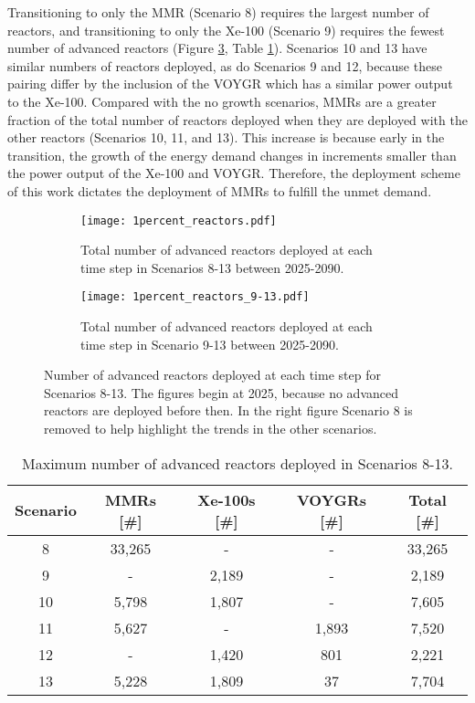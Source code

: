 Transitioning to only the 
\gls{MMR} (Scenario 8) requires the largest number of reactors, and 
transitioning to only the Xe-100 (Scenario 9) requires the fewest 
number of advanced reactors (Figure \ref{fig:1percent_reactors}, Table 
\ref{tab:reactors_1percent}). Scenarios 10 and 13 have similar numbers of 
reactors deployed, as do Scenarios 9 and 12, because these pairing differ 
by the inclusion of the VOYGR which has a similar power output to the 
Xe-100. 
Compared with the no growth scenarios, \glspl{MMR} are a greater 
fraction of the total number of reactors deployed when they are deployed 
with the other reactors (Scenarios 10, 11, and 13). This increase is 
because early in the transition, the growth of the energy demand 
changes in increments smaller than the power output of the Xe-100 and 
VOYGR. Therefore, the deployment scheme of this work dictates the 
deployment of \glspl{MMR} to fulfill the unmet demand.

\begin{figure}[h!]
    \centering
    \begin{subfigure}[b]{0.45\textwidth}
        \centering
        \texttt{[image: 1percent\_reactors.pdf]}
        \caption{Total number of advanced reactors deployed at 
        each time step in Scenarios 8-13 between 2025-2090.}
        \label{fig:1percent_reactors_all}
    \end{subfigure}
    \hfill
    \begin{subfigure}[b]{0.45\textwidth}
        \centering
        \texttt{[image: 1percent\_reactors\_9-13.pdf]}
        \caption{Total number of advanced reactors deployed at 
        each time step in Scenario 9-13 between 2025-2090.}
        \label{fig:1percent_reactors_9-13}
    \end{subfigure}
       \caption{Number of advanced reactors deployed at each time step 
       for Scenarios 8-13. The figures begin at 2025, because no advanced 
       reactors are deployed before then. In the right figure Scenario 
       8 is removed to help highlight the trends in the other scenarios.}
       \label{fig:1percent_reactors}
\end{figure}

\begin{table}
    \centering 
    \caption{Maximum number of advanced reactors deployed in Scenarios 8-13.}
    \label{tab:reactors_1percent}
    \begin{tabular}{c c c c c}
        \hline
        Scenario & \glspl{MMR} [\#]& Xe-100s [\#]& VOYGRs [\#] 
        & Total [\#]\\\hline
        8 & 33,265 & - & - & 33,265\\
        9 & - & 2,189 & - & 2,189 \\
        10 & 5,798 & 1,807 & - & 7,605\\
        11 & 5,627 & - & 1,893 & 7,520\\
        12 & - & 1,420 & 801 & 2,221\\
        13 & 5,228 & 1,809 & 37 & 7,704\\
        \hline
    \end{tabular}
\end{table}

